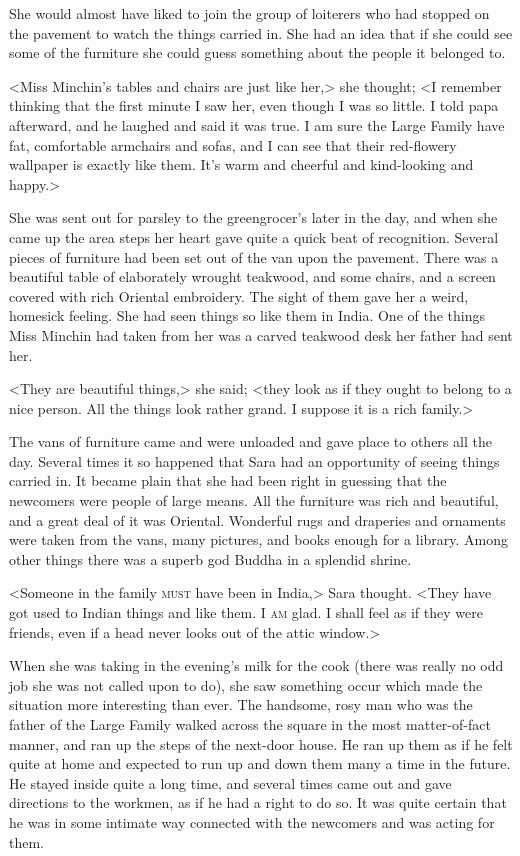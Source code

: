 She would almost have liked to join the group of loiterers who had stopped on the pavement to watch the things carried in. She had an idea that if she could see some of the furniture she could guess something about the people it belonged to.

<Miss Minchin's tables and chairs are just like her,> she thought; <I remember thinking that the first minute I saw her, even though I was so little. I told papa afterward, and he laughed and said it was true. I am sure the Large Family have fat, comfortable armchairs and sofas, and I can see that their red-flowery wallpaper is exactly like them. It's warm and cheerful and kind-looking and happy.>

She was sent out for parsley to the greengrocer's later in the day, and when she came up the area steps her heart gave quite a quick beat of recognition. Several pieces of furniture had been set out of the van upon the pavement. There was a beautiful table of elaborately wrought teakwood, and some chairs, and a screen covered with rich Oriental embroidery. The sight of them gave her a weird, homesick feeling. She had seen things so like them in India. One of the things Miss Minchin had taken from her was a carved teakwood desk her father had sent her.

<They are beautiful things,> she said; <they look as if they ought to belong to a nice person. All the things look rather grand. I suppose it is a rich family.>

The vans of furniture came and were unloaded and gave place to others all the day. Several times it so happened that Sara had an opportunity of seeing things carried in. It became plain that she had been right in guessing that the newcomers were people of large means. All the furniture was rich and beautiful, and a great deal of it was Oriental. Wonderful rugs and draperies and ornaments were taken from the vans, many pictures, and books enough for a library. Among other things there was a superb god Buddha in a splendid shrine.

<Someone in the family \textsc{must} have been in India,> Sara thought. <They have got used to Indian things and like them. I \textsc{am} glad. I shall feel as if they were friends, even if a head never looks out of the attic window.>

When she was taking in the evening's milk for the cook (there was really no odd job she was not called upon to do), she saw something occur which made the situation more interesting than ever. The handsome, rosy man who was the father of the Large Family walked across the square in the most matter-of-fact manner, and ran up the steps of the next-door house. He ran up them as if he felt quite at home and expected to run up and down them many a time in the future. He stayed inside quite a long time, and several times came out and gave directions to the workmen, as if he had a right to do so. It was quite certain that he was in some intimate way connected with the newcomers and was acting for them.

